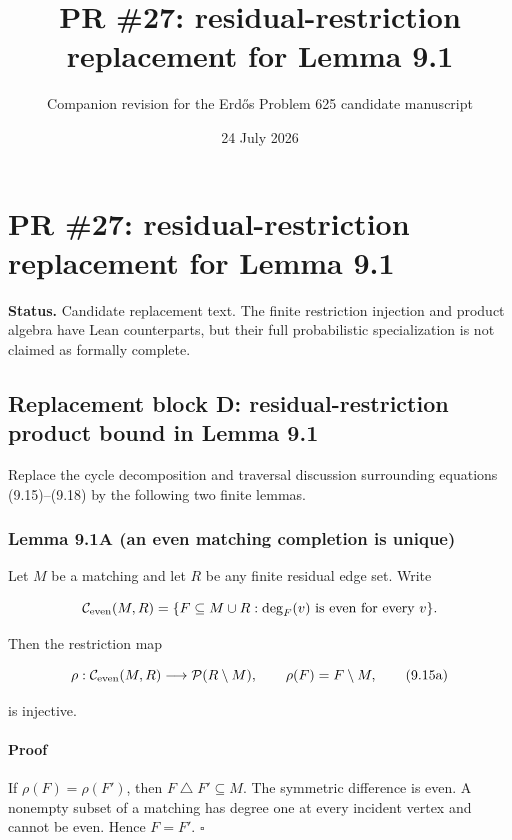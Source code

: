 \documentclass[11pt]{article}
\title{PR \#27: residual-restriction replacement for Lemma 9.1}
\author{Companion revision for the Erd\H{o}s Problem 625 candidate manuscript}
\date{24 July 2026}
\begin{document}
\maketitle
\section{PR \#27: residual-restriction replacement for Lemma 9.1}\label{pr-27-residual-restriction-replacement-for-lemma-9.1}

\textbf{Status.} Candidate replacement text. The finite restriction injection and product algebra have Lean counterparts, but their full probabilistic specialization is not claimed as formally complete.

\subsection{Replacement block D: residual-restriction product bound in Lemma 9.1}\label{replacement-block-d-residual-restriction-product-bound-in-lemma-9.1}

Replace the cycle decomposition and traversal discussion surrounding equations (9.15)--(9.18) by the following two finite lemmas.

\subsubsection{Lemma 9.1A (an even matching completion is unique)}\label{lemma-9.1a-an-even-matching-completion-is-unique}

Let \(M\) be a matching and let \(R\) be any finite residual edge set. Write

\[
 \mathcal C_{\rm even}(M,R)
 =\{F\subseteq M\cup R:\deg_F(v)\text{ is even for every }v\}.
\]

Then the restriction map

\[
 \rho:\mathcal C_{\rm even}(M,R)\longrightarrow\mathcal P(R\setminus M),
 \qquad \rho(F)=F\setminus M,
 \tag{9.15a}
\]

is injective.

\paragraph{Proof}\label{proof}

If \(\rho(F)=\rho(F')\), then \(F\mathbin\triangle F'\subseteq M\). The symmetric difference is even. A nonempty subset of a matching has degree one at every incident vertex and cannot be even. Hence \(F=F'\). \(\square\)
\end{document}
